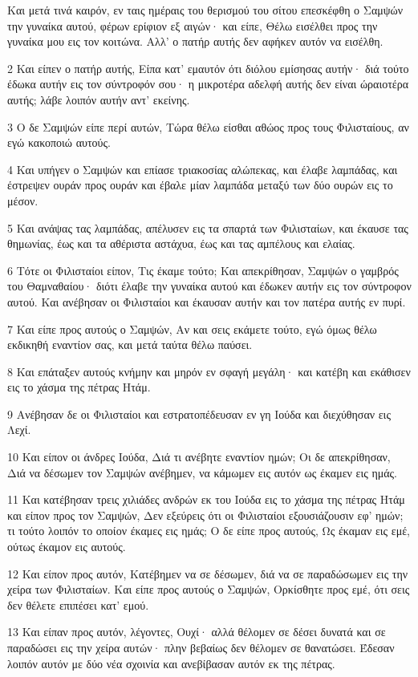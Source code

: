 \par Και μετά τινά καιρόν, εν ταις ημέραις του θερισμού του σίτου επεσκέφθη ο Σαμψών την γυναίκα αυτού, φέρων ερίφιον εξ αιγών· και είπε, Θέλω εισέλθει προς την γυναίκα μου εις τον κοιτώνα. Αλλ' ο πατήρ αυτής δεν αφήκεν αυτόν να εισέλθη.
\par 2 Και είπεν ο πατήρ αυτής, Είπα κατ' εμαυτόν ότι διόλου εμίσησας αυτήν· διά τούτο έδωκα αυτήν εις τον σύντροφόν σου· η μικροτέρα αδελφή αυτής δεν είναι ώραιοτέρα αυτής; λάβε λοιπόν αυτήν αντ' εκείνης.
\par 3 Ο δε Σαμψών είπε περί αυτών, Τώρα θέλω είσθαι αθώος προς τους Φιλισταίους, αν εγώ κακοποιώ αυτούς.
\par 4 Και υπήγεν ο Σαμψών και επίασε τριακοσίας αλώπεκας, και έλαβε λαμπάδας, και έστρεψεν ουράν προς ουράν και έβαλε μίαν λαμπάδα μεταξύ των δύο ουρών εις το μέσον.
\par 5 Και ανάψας τας λαμπάδας, απέλυσεν εις τα σπαρτά των Φιλισταίων, και έκαυσε τας θημωνίας, έως και τα αθέριστα αστάχυα, έως και τας αμπέλους και ελαίας.
\par 6 Τότε οι Φιλισταίοι είπον, Τις έκαμε τούτο; Και απεκρίθησαν, Σαμψών ο γαμβρός του Θαμναθαίου· διότι έλαβε την γυναίκα αυτού και έδωκεν αυτήν εις τον σύντροφον αυτού. Και ανέβησαν οι Φιλισταίοι και έκαυσαν αυτήν και τον πατέρα αυτής εν πυρί.
\par 7 Και είπε προς αυτούς ο Σαμψών, Αν και σεις εκάμετε τούτο, εγώ όμως θέλω εκδικηθή εναντίον σας, και μετά ταύτα θέλω παύσει.
\par 8 Και επάταξεν αυτούς κνήμην και μηρόν εν σφαγή μεγάλη· και κατέβη και εκάθισεν εις το χάσμα της πέτρας Ητάμ.
\par 9 Ανέβησαν δε οι Φιλισταίοι και εστρατοπέδευσαν εν γη Ιούδα και διεχύθησαν εις Λεχί.
\par 10 Και είπον οι άνδρες Ιούδα, Διά τι ανέβητε εναντίον ημών; Οι δε απεκρίθησαν, Διά να δέσωμεν τον Σαμψών ανέβημεν, να κάμωμεν εις αυτόν ως έκαμεν εις ημάς.
\par 11 Και κατέβησαν τρεις χιλιάδες ανδρών εκ του Ιούδα εις το χάσμα της πέτρας Ητάμ και είπον προς τον Σαμψών, Δεν εξεύρεις ότι οι Φιλισταίοι εξουσιάζουσιν εφ' ημών; τι τούτο λοιπόν το οποίον έκαμες εις ημάς; Ο δε είπε προς αυτούς, Ως έκαμαν εις εμέ, ούτως έκαμον εις αυτούς.
\par 12 Και είπον προς αυτόν, Κατέβημεν να σε δέσωμεν, διά να σε παραδώσωμεν εις την χείρα των Φιλισταίων. Και είπε προς αυτούς ο Σαμψών, Ορκίσθητε προς εμέ, ότι σεις δεν θέλετε επιπέσει κατ' εμού.
\par 13 Και είπαν προς αυτόν, λέγοντες, Ουχί· αλλά θέλομεν σε δέσει δυνατά και σε παραδώσει εις την χείρα αυτών· πλην βεβαίως δεν θέλομεν σε θανατώσει. Έδεσαν λοιπόν αυτόν με δύο νέα σχοινία και ανεβίβασαν αυτόν εκ της πέτρας.
